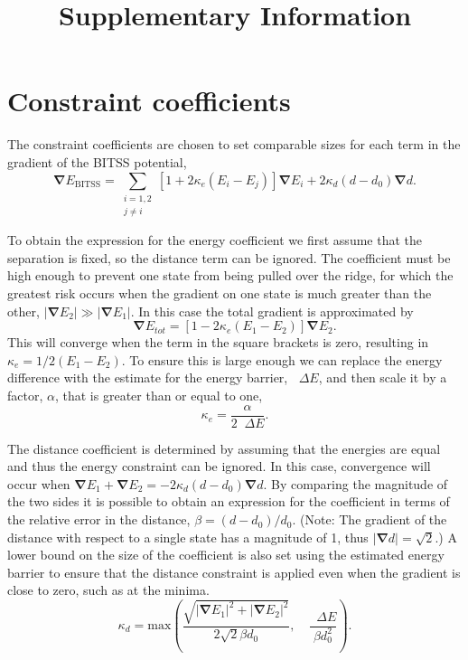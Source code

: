 \documentclass[aps,prl]{revtex4}
\newcommand{\abs}[1]{\left| #1 \right|}
\newcommand{\grad}{\bm{\nabla}}
\newcommand{\upDelta}{\mathop{}\!\Delta}
\begin{document}
\title{Supplementary Information}
\maketitle

\section{Constraint coefficients}
The constraint coefficients are chosen to set comparable sizes for each term in the gradient of the BITSS potential,
\begin{equation} \label{eq:gradBITSS}
  \grad E_\text{BITSS} = \sum_{\substack{i=1,2 \\ j\neq i}} \left[ 1 + 2 \kappa_e (E_i - E_j) \right] \grad E_i + 2 \kappa_d (d - d_0) \grad d.
\end{equation}

To obtain the expression for the energy coefficient we first assume that the separation is fixed, so the distance term can be ignored.
The coefficient must be high enough to prevent one state from being pulled over the ridge, for which the greatest risk occurs when the gradient on one state is much greater than the other, $\abs{\grad E_2} \gg \abs{\grad E_1}$.
In this case the total gradient is approximated by
\begin{equation}
  \grad E_{tot} = \left[ 1 - 2 \kappa_e (E_1 - E_2) \right] \grad E_2.
\end{equation}
This will converge when the term in the square brackets is zero, resulting in $\kappa_e = 1 / 2 (E_1 - E_2)$.
To ensure this is large enough we can replace the energy difference with the estimate for the energy barrier, $\upDelta E$, and then scale it by a factor, $\alpha$, that is greater than or equal to one,
\begin{equation}
  \kappa_e = \frac {\alpha} {2 \upDelta E}.
\end{equation}

The distance coefficient is determined by assuming that the energies are equal and thus the energy constraint can be ignored.
In this case, convergence will occur when $\grad E_1 + \grad E_2 = -2 \kappa_d (d - d_0) \grad d$.
By comparing the magnitude of the two sides it is possible to obtain an expression for the coefficient in terms of the relative error in the distance, $\beta = (d - d_0) / d_0$.
(Note: The gradient of the distance with respect to a single state has a magnitude of 1, thus $\abs{\grad d} = \sqrt{2}$.)
A lower bound on the size of the coefficient is also set using the estimated energy barrier to ensure that the distance constraint is applied even when the gradient is close to zero, such as at the minima.
\begin{equation}
  \kappa_d = \mathrm{max} \! \left(
  \frac {\sqrt{\abs{\grad E_1}^2 + \abs{\grad E_2}^2}} {2 \sqrt{2} \beta d_0}, \quad
  \frac{\upDelta E}{\beta d_0^2} \right).
\end{equation}
\end{document}
